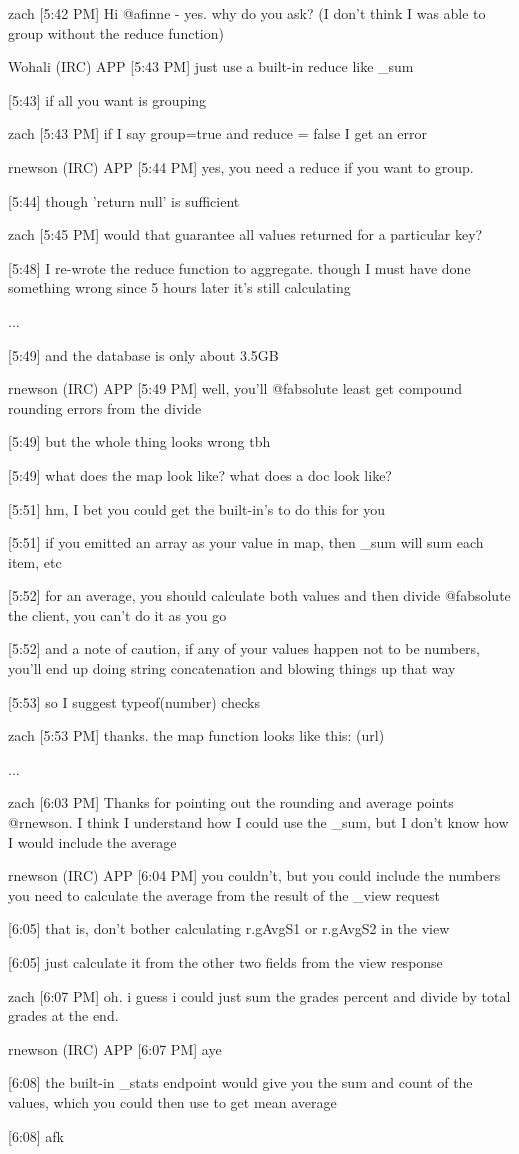 zach [5:42 PM]
Hi @afinne - yes. why do you ask? (I don't think I was able to group without the reduce function)

Wohali (IRC) APP [5:43 PM]
just use a built-in reduce like \_sum

[5:43]
if all you want is grouping

zach [5:43 PM]
if I say group=true and reduce = false I get an error

rnewson (IRC) APP [5:44 PM]
yes, you need a reduce if you want to group.

[5:44]
though 'return null' is sufficient

zach [5:45 PM]
would that guarantee all values returned for a particular key?

[5:48]
I re-wrote the reduce function to aggregate. though I must have done something wrong since 5 hours later it's still calculating

...

[5:49]
and the database is only about 3.5GB

rnewson (IRC) APP [5:49 PM]
well, you'll @fabsolute least get compound rounding errors from the divide

    [5:49]
but the whole thing looks wrong tbh

    [5:49]
what does the map look like? what does a doc look like?

[5:51]
hm, I bet you could get the built-in's to do this for you

    [5:51]
if you emitted an array as your value in map, then \_sum will sum each item, etc

    [5:52]
for an average, you should calculate both values and then divide @fabsolute the client, you can't do it as you go

    [5:52]
and a note of caution, if any of your values happen not to be numbers, you'll end up doing string concatenation and blowing things up that way

    [5:53]
so I suggest typeof(number) checks

zach [5:53 PM]
thanks. the map function looks like this: (url)

...

zach [6:03 PM]
Thanks for pointing out the rounding and average points @rnewson. I think I understand how I could use the \_sum, but I don't know how I would include the average

rnewson (IRC) APP [6:04 PM]
you couldn't, but you could include the numbers you need to calculate the average from the result of the \_view request

    [6:05]
that is, don't bother calculating r.gAvgS1 or r.gAvgS2 in the view

    [6:05]
just calculate it from the other two fields from the view response

zach [6:07 PM]
oh. i guess i could just sum the grades percent and divide by total grades at the end.

rnewson (IRC) APP [6:07 PM]
aye

    [6:08]
the built-in \_stats endpoint would give you the sum and count of the values, which you could then use to get mean average

    [6:08]
afk